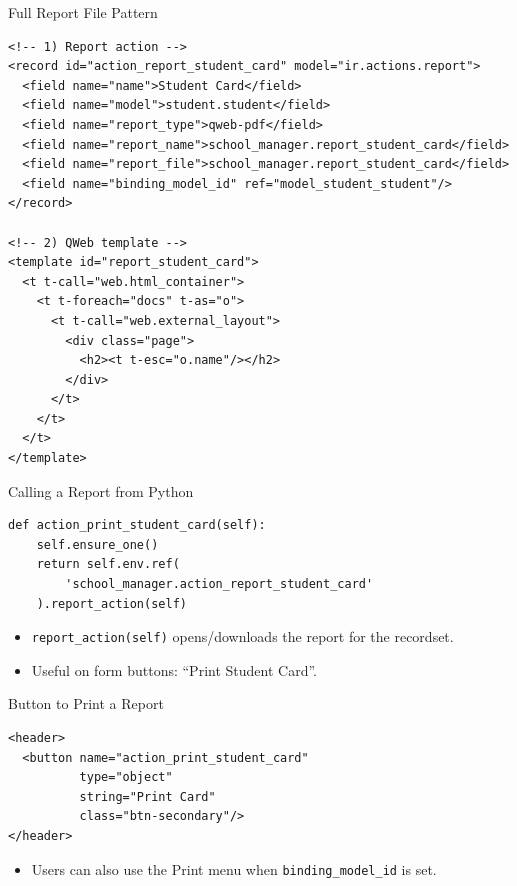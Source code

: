 \begin{frame}[fragile]{Full Report File Pattern}
\begin{lstlisting}[style=xml]
<!-- 1) Report action -->
<record id="action_report_student_card" model="ir.actions.report">
  <field name="name">Student Card</field>
  <field name="model">student.student</field>
  <field name="report_type">qweb-pdf</field>
  <field name="report_name">school_manager.report_student_card</field>
  <field name="report_file">school_manager.report_student_card</field>
  <field name="binding_model_id" ref="model_student_student"/>
</record>

<!-- 2) QWeb template -->
<template id="report_student_card">
  <t t-call="web.html_container">
	<t t-foreach="docs" t-as="o">
	  <t t-call="web.external_layout">
		<div class="page">
		  <h2><t t-esc="o.name"/></h2>
		</div>
	  </t>
	</t>
  </t>
</template>
\end{lstlisting}
\end{frame}

\begin{frame}[fragile]{Calling a Report from Python}
\begin{lstlisting}
def action_print_student_card(self):
	self.ensure_one()
	return self.env.ref(
		'school_manager.action_report_student_card'
	).report_action(self)
\end{lstlisting}
	\begin{itemize}
		\item \texttt{report\_action(self)} opens/downloads the report for the recordset.
		\item Useful on form buttons: ``Print Student Card''.
	\end{itemize}
\end{frame}

\begin{frame}[fragile]{Button to Print a Report}
\begin{lstlisting}[style=xml]
<header>
  <button name="action_print_student_card"
		  type="object"
		  string="Print Card"
		  class="btn-secondary"/>
</header>
\end{lstlisting}
	\begin{itemize}
		\item Users can also use the Print menu when \texttt{binding\_model\_id} is set.
	\end{itemize}
\end{frame}

